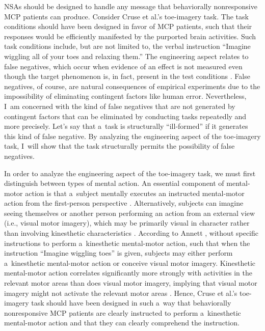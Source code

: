 NSAs should be designed to handle any message that behaviorally nonresponsive MCP patients can produce. Consider Cruse et al.'s
\parencite*[][]{cruse_bedside_2011} %
 toe-imagery task. The task conditions should have been designed in favor of MCP patients, such that their responses would be efficiently manifested by the purported brain activities. Such task conditions include, but are not limited to, the verbal instruction ``Imagine wiggling all of your toes and relaxing them.'' The engineering aspect relates to false negatives, which occur when evidence of an effect is not measured even though the target phenomenon is, in fact, present in the test conditions 
\parencite[][p.591]{peterson_risk_2015}. %
 False negatives, of course, are natural consequences of empirical experiments due to the impossibility of eliminating contingent factors like human error. Nevertheless, I~am concerned with the kind of false negatives that are not generated by contingent factors that can be eliminated by conducting tasks repeatedly and more precisely. Let's say that a~task is structurally ``ill-formed'' if it generates this kind of false negative. By analyzing the engineering aspect of the toe-imagery task, I~will show that the task structurally permits the possibility of false negatives.

In order to analyze the engineering aspect of the toe-imagery task, we must first distinguish between types of mental action. An essential component of mental-motor action is that a~subject mentally executes an instructed mental-motor action from the first-person perspective
\parencite[i.e., kinesthetic mental-motor action][]{ehrsson_imagery_2003}. %
 Alternatively, subjects can imagine seeing themselves or another person performing an action from an external view (i.e., visual motor imagery), which may be primarily visual in character rather than involving kinesthetic characteristics 
\parencite[][]{sekiyama_mental_1983}. %
 According to Annett 
\parencite*[][]{annett_motor_1995}, %
 without specific instructions to perform a~kinesthetic mental-motor action, such that when the instruction ``Imagine wiggling toes'' is given, subjects may either perform a~kinesthetic mental-motor action or conceive visual motor imagery. Kinesthetic mental-motor action correlates significantly more strongly with activities in the relevant motor areas than does visual motor imagery, implying that visual motor imagery might not activate the relevant motor areas 
\parencite[][]{neuper_imagery_2005}. %
 Hence, Cruse et al.'s toe-imagery task should have been designed in such a~way that behaviorally nonresponsive MCP patients are clearly instructed to perform a~kinesthetic mental-motor action and that they can clearly comprehend the instruction.

